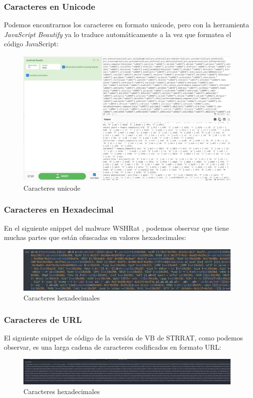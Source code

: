 \documentclass[15pt]{article}
\begin{document}
	\subsubsection{Caracteres en Unicode}
	Podemos encontrarnos los caracteres en formato unicode, pero con la herramienta \textit{JavaScript Beautify} ya lo traduce automáticamente a la vez que formatea el código JavaScript:
	
	\begin{figure}[H]
		\centering
		\includegraphics[width=15cm]{images/unicode.png}
		\caption{Caracteres unicode}
	\end{figure}

	\subsubsection{Caracteres en Hexadecimal}
	En el siguiente snippet del malware WSHRat \cite{javascript_malware}, podemos observar que tiene muchas partes que están ofuscadas en valores hexadecimales:
	\begin{figure}[H]
		\centering
		\includegraphics[width=15cm]{images/hexadecimal.png}
		\caption{Caracteres hexadecimales}
	\end{figure}

	\subsubsection{Caracteres de URL}
	El siguiente snippet de código de la versión de VB de STRRAT, como podemos observar, es una larga cadena de caracteres codificados en formato URL:
	\begin{figure}[H]
		\centering
		\includegraphics[width=18cm]{images/url_char.png}
		\caption{Caracteres hexadecimales}
	\end{figure}
\end{document}
